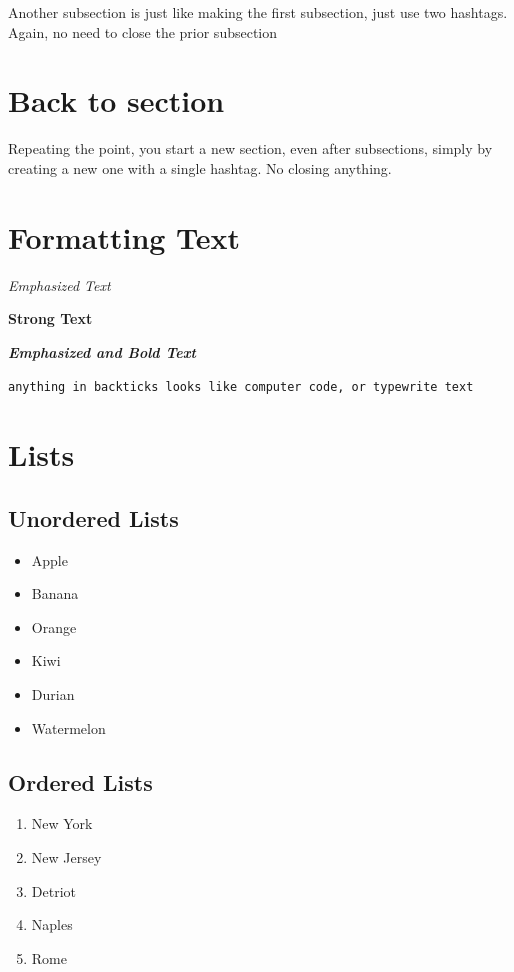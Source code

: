\documentclass[]{article}
\providecommand{\tightlist}{%
  \setlength{\itemsep}{0pt}\setlength{\parskip}{0pt}}
\begin{document}
Another subsection is just like making the first subsection, just use
two hashtags. Again, no need to close the prior subsection

\section{Back to section}\label{back-to-section}

Repeating the point, you start a new section, even after subsections,
simply by creating a new one with a single hashtag. No closing anything.

\section{Formatting Text}\label{formatting-text}

\emph{Emphasized Text}

\textbf{Strong Text}

\textbf{\emph{Emphasized and Bold Text}}

\texttt{anything\ in\ backticks\ looks\ like\ computer\ code,\ or\ typewrite\ text}

\section{Lists}\label{lists}

\subsection{Unordered Lists}\label{unordered-lists}

\begin{itemize}
\tightlist
\item
  Apple
\item
  Banana
\item
  Orange
\item
  Kiwi
\item
  Durian
\item
  Watermelon
\end{itemize}

\subsection{Ordered Lists}\label{ordered-lists}

\begin{enumerate}
\def\labelenumi{\arabic{enumi}.}
\tightlist
\item
  New York
\item
  New Jersey
\item
  Detriot
\item
  Naples
\item
  Rome
\end{enumerate}
\end{document}
